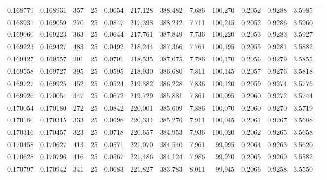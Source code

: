 \begin{tabular}{rrrrrrrrrrrrr}
0.168779 & 0.168931 &   357 &  25 &                                     0.0654 & 217,128 & 388,482 &   7,686 & 100,270 & 0.2052 & 0.9288 & 3.5985 \\
0.168931 & 0.169059 &   270 &  25 &                                     0.0847 & 217,398 & 388,212 &   7,711 & 100,245 & 0.2052 & 0.9286 & 3.5960 \\
0.169060 & 0.169223 &   363 &  25 &                                     0.0644 & 217,761 & 387,849 &   7,736 & 100,220 & 0.2053 & 0.9283 & 3.5927 \\
0.169223 & 0.169427 &   483 &  25 &                                     0.0492 & 218,244 & 387,366 &   7,761 & 100,195 & 0.2055 & 0.9281 & 3.5882 \\
0.169427 & 0.169557 &   291 &  25 &                                     0.0791 & 218,535 & 387,075 &   7,786 & 100,170 & 0.2056 & 0.9279 & 3.5855 \\
0.169558 & 0.169727 &   395 &  25 &                                     0.0595 & 218,930 & 386,680 &   7,811 & 100,145 & 0.2057 & 0.9276 & 3.5818 \\
0.169727 & 0.169925 &   452 &  25 &                                     0.0524 & 219,382 & 386,228 &   7,836 & 100,120 & 0.2059 & 0.9274 & 3.5776 \\
0.169926 & 0.170054 &   347 &  25 &                                     0.0672 & 219,729 & 385,881 &   7,861 & 100,095 & 0.2060 & 0.9272 & 3.5744 \\
0.170054 & 0.170180 &   272 &  25 &                                     0.0842 & 220,001 & 385,609 &   7,886 & 100,070 & 0.2060 & 0.9270 & 3.5719 \\
0.170180 & 0.170315 &   333 &  25 &                                     0.0698 & 220,334 & 385,276 &   7,911 & 100,045 & 0.2061 & 0.9267 & 3.5688 \\
0.170316 & 0.170457 &   323 &  25 &                                     0.0718 & 220,657 & 384,953 &   7,936 & 100,020 & 0.2062 & 0.9265 & 3.5658 \\
0.170458 & 0.170627 &   413 &  25 &                                     0.0571 & 221,070 & 384,540 &   7,961 &  99,995 & 0.2064 & 0.9263 & 3.5620 \\
0.170628 & 0.170796 &   416 &  25 &                                     0.0567 & 221,486 & 384,124 &   7,986 &  99,970 & 0.2065 & 0.9260 & 3.5582 \\
0.170797 & 0.170942 &   341 &  25 &                                     0.0683 & 221,827 & 383,783 &   8,011 &  99,945 & 0.2066 & 0.9258 & 3.5550 \\

\end{tabular}
